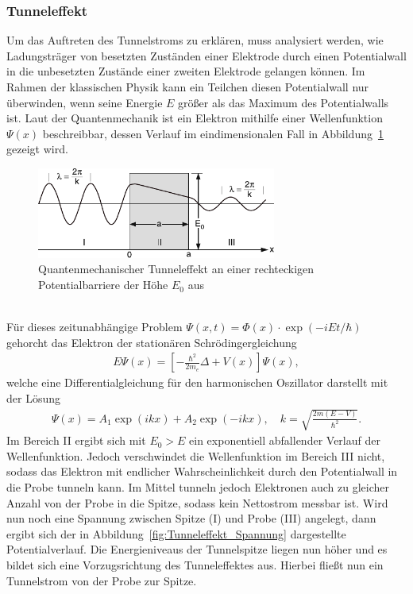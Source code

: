 \documentclass[a4paper,twoside,final]{article}
\begin{document}
\subsubsection{Tunneleffekt}
Um das Auftreten des Tunnelstroms zu erklären, muss analysiert werden, wie Ladungsträger von besetzten Zuständen einer Elektrode durch einen Potentialwall in die unbesetzten Zustände einer zweiten Elektrode gelangen können. Im Rahmen der klassischen Physik kann ein Teilchen diesen Potentialwall nur überwinden, wenn seine Energie $E$ größer als das Maximum des Potentialwalls ist. Laut der Quantenmechanik ist ein Elektron mithilfe einer Wellenfunktion $\Psi(x)$ beschreibbar, dessen Verlauf im eindimensionalen Fall in Abbildung~\ref{fig:Tunneleffekt} gezeigt wird.
\begin{figure}[htp]
    \centering
    \includegraphics[width=0.7\textwidth]{Bilder/Tunneleffekt.pdf}
    \caption{Quantenmechanischer Tunneleffekt an einer rechteckigen Potentialbarriere der Höhe $E_0$ aus~\cite{Demtroeder}}
    \label{fig:Tunneleffekt}
\end{figure}\\
Für dieses zeitunabhängige Problem $\Psi(x,t) = \Phi(x)\cdot\exp(-iEt/\hbar)$ gehorcht das Elektron der stationären Schrödingergleichung
\begin{align}
  E \Psi(x) = \left[-\frac{\hbar^2}{2m_e}\Delta + V(x)\right] \Psi(x),
\end{align}
welche eine Differentialgleichung für den harmonischen Oszillator darstellt mit der Lösung
\begin{align}
  \Psi(x) = A_1 \exp(ikx) + A_2 \exp(-ikx), \quad k=\sqrt{\frac{2m(E-V)}{\hbar^2}}.
\end{align}
Im Bereich II ergibt sich mit $E_0 > E$ ein exponentiell abfallender Verlauf der Wellenfunktion. Jedoch verschwindet die Wellenfunktion im Bereich III nicht, sodass das Elektron mit endlicher Wahrscheinlichkeit durch den Potentialwall in die Probe tunneln kann. Im Mittel tunneln jedoch Elektronen auch zu gleicher Anzahl von der Probe in die Spitze, sodass kein Nettostrom messbar ist. Wird nun noch eine Spannung zwischen Spitze (I) und Probe (III) angelegt, dann ergibt sich der in Abbildung~\ref{fig:Tunneleffekt_Spannung} dargestellte Potentialverlauf. Die Energieniveaus der Tunnelspitze liegen nun höher und es bildet sich eine Vorzugsrichtung des Tunneleffektes aus. Hierbei fließt nun ein Tunnelstrom von der Probe zur Spitze.
\end{document}
